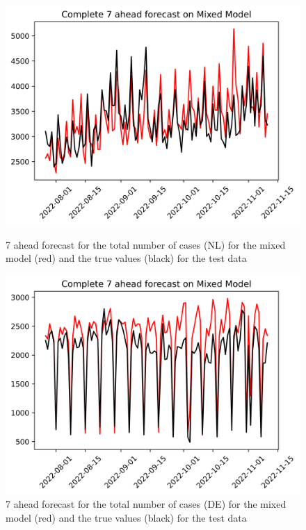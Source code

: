 \begin{figure}

\begin{minipage}{.45\textwidth}
  \centering
  \includegraphics[width=\linewidth]{pics/7_ah/Complete_7_ahead_Mixed Model.png}
  \caption{7 ahead forecast for the total number of cases (NL) for the mixed model (red) and the true values (black) for the test data}
  \label{fig:tot_cases_fc_7_mix}
\end{minipage}
\begin{minipage}{.45\textwidth}
  \centering
  \includegraphics[width=\linewidth]{pics/7_ah/DE_Complete_7_ahead_Mixed Model.png}
  \caption{7 ahead forecast for the total number of cases (DE) for the mixed model (red) and the true values (black) for the test data}
  \label{fig:tot_cases_fc_7_mix_DE}
\end{minipage}

\end{figure}


